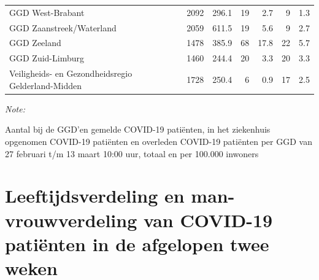 \documentclass[
  english,
  man,floatsintext]{apa6}
\begin{document}
\begin{table}
\begin{threeparttable}
\begin{tabular}{lrrrrrr}
GGD West-Brabant & 2092 & 296.1 & 19 & 2.7 & 9 & 1.3\\
GGD Zaanstreek/Waterland & 2059 & 611.5 & 19 & 5.6 & 9 & 2.7\\
GGD Zeeland & 1478 & 385.9 & 68 & 17.8 & 22 & 5.7\\
GGD Zuid-Limburg & 1460 & 244.4 & 20 & 3.3 & 20 & 3.3\\
Veiligheids- en Gezondheidsregio Gelderland-Midden & 1728 & 250.4 & 6 & 0.9 & 17 & 2.5\\
\bottomrule
\end{tabular}
\begin{tablenotes}
\item \textit{Note: } 
\item Aantal bij de GGD’en gemelde COVID-19 patiënten, in het ziekenhuis opgenomen COVID-19 patiënten en overleden COVID-19 patiënten per GGD van 27 februari t/m 13 maart 10:00 uur, totaal en per 100.000 inwoners
\end{tablenotes}
\end{threeparttable}
\endgroup{}
\end{table}

\newpage

\hypertarget{leeftijdsverdeling-en-man-vrouwverdeling-van-covid-19-patiuxebnten-in-de-afgelopen-twee-weken}{%
\section{Leeftijdsverdeling en man-vrouwverdeling van COVID-19 patiënten in de afgelopen twee weken}\label{leeftijdsverdeling-en-man-vrouwverdeling-van-covid-19-patiuxebnten-in-de-afgelopen-twee-weken}}
\end{document}
